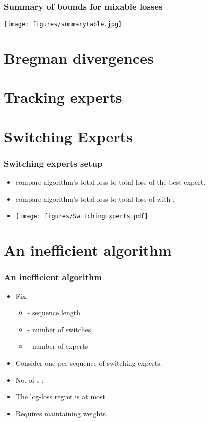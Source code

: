 \documentclass[handout]{beamer}
\begin{document}
\begin{frame}
\frametitle{Summary of bounds for mixable losses}
\texttt{[image: figures/summarytable.jpg]}
\end{frame}

\section{Bregman divergences}

\section{Tracking experts}
\section{Switching Experts}


\begin{frame}
\frametitle{Switching experts setup}
\begin{itemize}
\item {} compare algorithm's total loss to total
  loss of the best expert.
\item {} compare algorithm's total loss to total
  loss of  with  .
\item
\texttt{[image: figures/SwitchingExperts.pdf]}
\end{itemize}
\end{frame}

\section{An inefficient algorithm}

\begin{frame}
\frametitle{An inefficient algorithm}
\begin{itemize}
\item Fix:
\begin{itemize}
\item {} - sequence length
\item {} - number of switches
\item {} - number of experts
\end{itemize}
\item Consider one  per sequence of switching experts.
\item No. of s : 
\item The log-loss regret is at most 
\item Requires maintaining  weights.
\end{itemize}
\end{frame}
\end{document}
